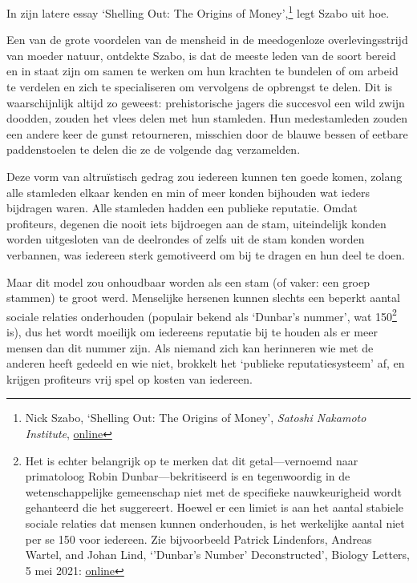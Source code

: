 \documentclass[
  a5paper,
  smalldemyvopaper,11pt,twoside,onecolumn,openright,extrafontsizes]{memoir}
\begin{document}
In zijn latere essay `Shelling Out: The Origins of Money',\footnote{Nick
  Szabo, `Shelling Out: The Origins of Money', \emph{Satoshi Nakamoto
  Institute},
  \href{https://nakamotoinstitute.org/library/shelling-out/}{online}}
legt Szabo uit hoe.

Een van de grote voordelen van de mensheid in de meedogenloze
overlevingsstrijd van moeder natuur, ontdekte Szabo, is dat de meeste
leden van de soort bereid en in staat zijn om samen te werken om hun
krachten te bundelen of om arbeid te verdelen en zich te specialiseren
om vervolgens de opbrengst te delen. Dit is waarschijnlijk altijd zo
geweest: prehistorische jagers die succesvol een wild zwijn doodden,
zouden het vlees delen met hun stamleden. Hun medestamleden zouden een
andere keer de gunst retourneren, misschien door de blauwe bessen of
eetbare paddenstoelen te delen die ze de volgende dag verzamelden.

Deze vorm van altruïstisch gedrag zou iedereen kunnen ten goede komen,
zolang alle stamleden elkaar kenden en min of meer konden bijhouden wat
ieders bijdragen waren. Alle stamleden hadden een publieke reputatie.
Omdat profiteurs, degenen die nooit iets bijdroegen aan de stam,
uiteindelijk konden worden uitgesloten van de deelrondes of zelfs uit de
stam konden worden verbannen, was iedereen sterk gemotiveerd om bij te
dragen en hun deel te doen.

Maar dit model zou onhoudbaar worden als een stam (of vaker: een groep
stammen) te groot werd. Menselijke hersenen kunnen slechts een beperkt
aantal sociale relaties onderhouden (populair bekend als `Dunbar's
nummer', wat 150\footnote{Het is echter belangrijk op te merken dat dit
  getal---vernoemd naar primatoloog Robin Dunbar---bekritiseerd is en
  tegenwoordig in de wetenschappelijke gemeenschap niet met de
  specifieke nauwkeurigheid wordt gehanteerd die het suggereert. Hoewel
  er een limiet is aan het aantal stabiele sociale relaties dat mensen
  kunnen onderhouden, is het werkelijke aantal niet per se 150 voor
  iedereen. Zie bijvoorbeeld Patrick Lindenfors, Andreas Wartel, and
  Johan Lind, `'Dunbar's Number' Deconstructed', Biology Letters, 5 mei
  2021:
  \href{https://royalsocietypublishing.org/doi/10.1098/rsbl.2021.0158}{online}}
is), dus het wordt moeilijk om iedereens reputatie bij te houden als er
meer mensen dan dit nummer zijn. Als niemand zich kan herinneren wie met
de anderen heeft gedeeld en wie niet, brokkelt het `publieke
reputatiesysteem' af, en krijgen profiteurs vrij spel op kosten van
iedereen.
\end{document}
